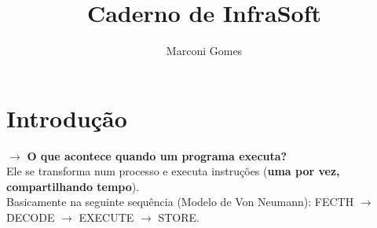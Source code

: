 \documentclass[12pt]{article}
\begin{document}
\nocite{*}

\title{Caderno de InfraSoft}
\author{Marconi Gomes}

\maketitle


\section{Introdução}
    $\rightarrow$ \textbf{O que acontece quando um programa executa?} 
    \\ Ele se transforma num processo e executa instruções (\textbf{uma por vez, compartilhando tempo}). 
    \\Basicamente na seguinte sequência (Modelo de Von Neumann): FECTH $\rightarrow$ DECODE $\rightarrow$ EXECUTE $\rightarrow$ STORE.
    

\end{document}
